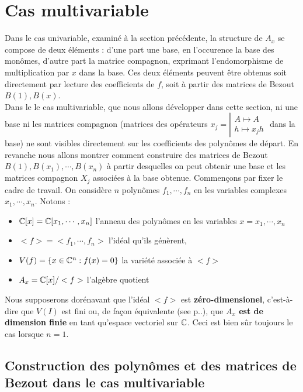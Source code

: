 \documentclass{standalone}
\begin{document}
  \section{Cas multivariable}
  Dans le cas univariable, examiné à la section précédente, la structure de $A_x$ se compose de deux éléments : d'une part une base, en l'occurence la base des monômes, d'autre part la matrice compagnon, exprimant l'endomorphisme de multiplication par $x$ dans la base. Ces deux éléments peuvent être obtenus soit directement par lecture des coefficients de $f$, soit à partir des matrices de Bezout $B(1), B(x)$. \\
  Dans le le cas multivariable, que nous allons développer dans cette section, ni une base ni les matrices compagnon
  (matrices des opérateurs
  $x_j = \left\vert
  \begin{array}{c}
  A \mapsto A \\
  h \mapsto x_jh
  \end{array}
  \right.$ dans la base) ne sont visibles directement sur les coefficients des polynômes de départ. En revanche nous allons montrer comment construire des matrices de Bezout $B(1), B(x_1), \cdots, B(x_n)$ à partir desquelles on peut obtenir une base et les matrices compagnon $X_j$ associées à la base obtenue. Commençons par fixer le cadre de travail.
  On considère $n$ polynômes $f_1,\cdots, f_n$ en les variables complexes $x_1,\cdots, x_n$. Notons :
  \begin{itemize}
  \item $\mathbb{C}[x] = \mathbb{C}[x_1,\cdots, x_n]$ l'anneau des polynômes en les variables $x = x_1,\cdots, x_n$
  \item $<f> = <f_1,\cdots, f_n>$ l'idéal qu'ils génèrent,
  \item $V(f) = \{x \in \mathbb{C}^n : f(x) = 0\}$ la variété associée à $<f>$
  \item $A_x = \mathbb{C}[x]/<f>$ l'algèbre quotient
  \end{itemize}
  Nous supposerons dorénavant que l'idéal $<f>$ est {\bf zéro-dimensionel},
  c'est-à-dire que $V(I)$ est fini ou, de façon équivalente  (see \cite{clo} p..), que {\bf $A_x$ est de dimension finie} en tant qu'espace vectoriel sur $\mathbb{C}$. Ceci est bien sûr toujours le cas lorsque $n = 1$.

  \subsection{Construction des polynômes et des matrices de Bezout dans le cas multivariable}
\end{document}
